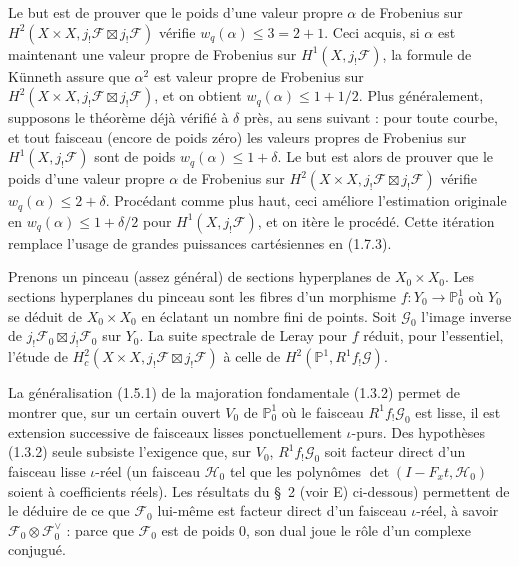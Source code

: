 \documentclass[12pt,a4paper]{article}
\theoremstyle{plain}
\theoremstyle{definition}
\theoremstyle{definition}
\theoremstyle{remark}
\begin{document}
Le but est de prouver que le poids d'une valeur propre $\alpha$ de Frobenius sur $H^2(X \times X, j_! \mathscr{F} \boxtimes j_! \mathscr{F})$ v\'erifie $w_q(\alpha) \leq 3 = 2+1$. Ceci acquis, si $\alpha$ est maintenant une valeur propre de Frobenius sur $H^1(X, j_! \mathscr{F})$, la formule de K\"unneth assure que $\alpha^2$ est valeur propre de Frobenius sur $H^2(X \times X, j_! \mathscr{F} \boxtimes j_! \mathscr{F})$, et on obtient $w_q(\alpha) \leq 1+1/2$. Plus g\'en\'eralement, supposons le th\'eor\`eme d\'ej\`a v\'erifi\'e \`a $\delta$ pr\`es, au sens suivant : pour toute courbe, et tout faisceau (encore de poids z\'ero) les valeurs propres de Frobenius sur $H^1(X, j_! \mathscr{F})$ sont de poids $w_q(\alpha) \leq 1+\delta$. Le but est alors de prouver que le poids d'une valeur propre $\alpha$ de Frobenius sur $H^2(X \times X, j_! \mathscr{F} \boxtimes j_! \mathscr{F})$ v\'erifie $w_q(\alpha) \leq 2+\delta$. Proc\'edant comme plus haut, ceci am\'eliore l'estimation originale en $w_q(\alpha) \leq 1+\delta/2$ pour $H^1(X, j_! \mathscr{F})$, et on it\`ere le proc\'ed\'e. Cette it\'eration remplace l'usage de grandes puissances cart\'esiennes en (1.7.3).

Prenons un pinceau (assez g\'en\'eral) de sections hyperplanes de $X_0 \times X_0$. Les sections hyperplanes du pinceau sont les fibres d'un morphisme $f: Y_0 \to \mathbb{P}_0^1$ o\`u $Y_0$ se d\'eduit de $X_0 \times X_0$ en \'eclatant un nombre fini de points. Soit $\mathscr{G}_0$ l'image inverse de $j_! \mathscr{F}_0 \boxtimes j_! \mathscr{F}_0$ sur $Y_0$. La suite spectrale de Leray pour $f$ r\'eduit, pour l'essentiel, l'\'etude de $H_c^2(X \times X, j_! \mathscr{F} \boxtimes j_! \mathscr{F})$ \`a celle de $H^2(\mathbb{P}^1, R^1 f_! \mathscr{G})$.

La g\'en\'eralisation (1.5.1) de la majoration fondamentale (1.3.2) permet de montrer que, sur un certain ouvert $V_0$ de $\mathbb{P}_0^1$ o\`u le faisceau $R^1 f_! \mathscr{G}_0$ est lisse, il est extension successive de faisceaux lisses ponctuellement $\iota$-purs. Des hypoth\`eses (1.3.2) seule subsiste l'exigence que, sur $V_0$, $R^1 f_! \mathscr{G}_0$ soit facteur direct d'un faisceau lisse $\iota$-r\'eel (un faisceau $\mathscr{H}_0$ tel que les polyn\^omes $\det(I - F_x t, \mathscr{H}_0)$ soient \`a coefficients r\'eels). Les r\'esultats du \S~2 (voir E) ci-dessous) permettent de le d\'eduire de ce que $\mathscr{F}_0$ lui-m\^eme est facteur direct d'un faisceau $\iota$-r\'eel, \`a savoir $\mathscr{F}_0 \otimes \mathscr{F}_0^\vee$ : parce que $\mathscr{F}_0$ est de poids $0$, son dual joue le r\^ole d'un complexe conjugu\'e.
\end{document}
